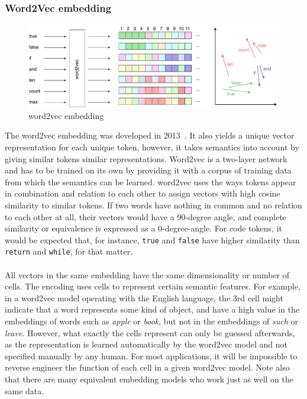 \documentclass[
a4paper,
pagesize,
pdftex,
12pt,
twoside, %
BCOR=5mm, %
ngerman,
fleqn,
final,
]{scrartcl}
\begin{document}
	\subsubsection{Word2Vec embedding}\label{word2vec}
	\begin{figure}[ht]
		\centering
		\includegraphics[width=\linewidth]{img/word2vecEmbedding}
		\caption{word2vec embedding}
		\label{fig:word2vecEmbedding}
	\end{figure}
	The word2vec embedding was developed in 2013~\cite{Mikolov.2013}. It also yields a unique vector representation for each unique token, however, it takes semantics into account by giving similar tokens similar representations. Word2vec is a two-layer network and has to be trained on its own by providing it with a corpus of training data from which the semantics can be learned. word2vec uses the ways tokens appear in combination and relation to each other to assign vectors with high cosine similarity to similar tokens. If two words have nothing in common and no relation to each other at all, their vectors would have a 90-degree angle, and complete similarity or equivalence is expressed as a 0-degree-angle. For code tokens, it would be expected that, for instance, \texttt{true} and \texttt{false} have higher similarity than \texttt{return} and \texttt{while}, for that matter.\\\\
	All vectors in the same embedding have the same dimensionality or number of cells. The encoding uses cells to represent certain semantic features. For example, in a word2vec model operating with the English language, the 3rd cell might indicate that a word represents some kind of object, and have a high value in the embeddings of words such as \textit{apple} or \textit{book}, but not in the embeddings of \textit{such} or \textit{leave}. However, what exactly the cells represent can only be guessed afterwards, as the representation is learned automatically by the word2vec model and not specified manually by any human. For most applications, it will be impossible to reverse engineer the function of each cell in a given word2vec model. Note also that there are many equivalent embedding models who work just as well on the same data.\\ 
\end{document}
